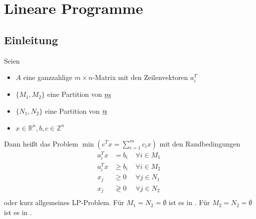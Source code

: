 \chapter{Lineare Programme}
\section{Einleitung}
\begin{definition}
Seien 
\begin{itemize}
\item $A$ eine ganzzahlige $m\times n$-Matrix mit den Zeilenvektoren $a_i^T$
\item $\{M_1,M_2\}$ eine Partition von $\laue{m}$
\item $\{N_1,N_2\}$ eine Partition von $\laue{n}$
\item $x \in \mathbb R^n, b,c \in \mathbb Z^n$
\end{itemize}
Dann heißt das Problem $\min(c^Tx = \sum_{i=1}^m c_ix)$ mit den Randbedingungen
\begin{align*}
a_i^Tx &= b_i \; &\forall i \in M_1 \\
a_i^Tx &\geq b_i \; &\forall i \in M_2 \\
x_j &\geq 0 \; &\forall j \in N_1 \\
x_j &\gtrless 0 \; &\forall j \in N_2 \\
\end{align*}
 oder kurz allgemeines LP-Problem.\newline %
Für $M_1 = N_2 = \emptyset$ ist es in .\newline %
Für $M_2 = N_2 = \emptyset$ ist es in .
\end{definition}

